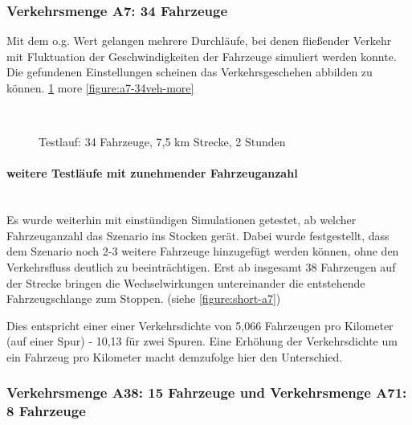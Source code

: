 \subsubsection{Verkehrsmenge A7: 34 Fahrzeuge}
\label{sec:szenario-a7}

Mit dem o.g. Wert gelangen mehrere Durchläufe, bei denen fließender Verkehr mit Fluktuation der Geschwindigkeiten der Fahrzeuge simuliert werden konnte.
Die gefundenen Einstellungen scheinen das Verkehrsgeschehen abbilden zu können.
\cref{figure:testrun-34veh-7ko5km}
more \cref{figure:a7-34veh-more}

\begin{figure}[hptb]
  \centering 
    \\
  \caption{Testlauf: 34 Fahrzeuge, 7,5 km Strecke, 2 Stunden} 
  \label{figure:testrun-34veh-7ko5km}
\end{figure}

\paragraph*{weitere Testläufe mit zunehmender Fahrzeuganzahl}
\hfill \\

Es wurde weiterhin mit einstündigen Simulationen getestet, ab welcher Fahrzeuganzahl das Szenario ins Stocken gerät.
Dabei wurde festgestellt, dass dem Szenario noch 2-3 weitere Fahrzeuge hinzugefügt werden können, ohne den Verkehrsfluss deutlich zu beeinträchtigen.
Erst ab insgesamt 38 Fahrzeugen auf der Strecke bringen die Wechselwirkungen untereinander die entstehende Fahrzeugschlange zum Stoppen. (siehe \cref{figure:short-a7})

Dies entspricht einer einer Verkehrsdichte von 5,066 Fahrzeugen pro Kilometer (auf einer Spur) - 10,13 für zwei Spuren.
Eine Erhöhung der Verkehrsdichte um ein Fahrzeug pro Kilometer macht demzufolge hier den Unterschied.




\subsubsection{Verkehrsmenge A38: 15 Fahrzeuge und Verkehrsmenge A71: 8 Fahrzeuge}
\label{sec:szenario-a38-a71}

